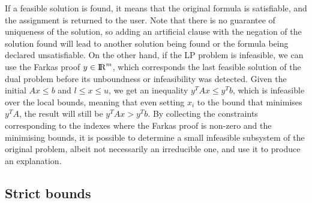\documentclass[runningheads]{llncs}
\begin{document}
If a feasible solution is found, it means that the original formula is satisfiable, and the assignment is returned to the user.
Note that there is no guarantee of uniqueness of the solution, so adding an artificial clause with the negation of the solution found will lead to another solution being found or the formula being declared unsatisfiable.
On the other hand, if the LP problem is infeasible, we can use the Farkas proof $y \in {\rm I\!R}^m$, which corresponds the last feasible solution of the dual problem before its unboundness or infeasibility was detected.
Given the initial  $Ax \le b$ and $l \le x \le u$, we get an inequality $y^T A x \le y^T b$, which is infeasible over the local bounds, meaning that even setting $x_i$ to the bound that minimises $y^T A$, the result will still be $y^T A x > y^T b$.
By collecting the constraints corresponding to the indexes where the Farkas proof is non-zero and the minimising bounds, it is possible to determine a small infeasible subsystem of the original problem, albeit not necessarily an irreducible one, and use it to produce an explanation.

\subsection{Strict bounds}
\label{sec:strict-bounds}
\end{document}
